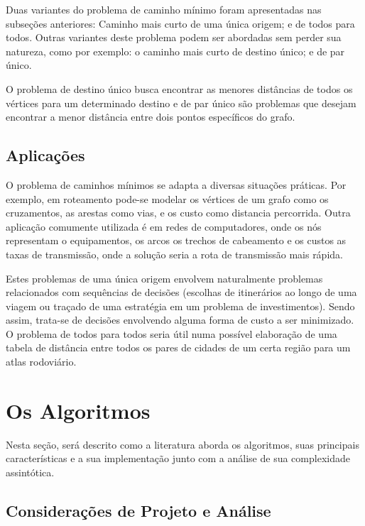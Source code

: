 \documentclass[12pt]{article}
\begin{document}
Duas variantes do problema de caminho mínimo foram apresentadas nas subseções anteriores: Caminho mais curto de uma única origem; e de todos para todos. Outras variantes deste problema podem ser abordadas sem perder sua natureza, como por exemplo: o caminho mais curto de destino único; e de par único.

	O problema de destino único busca encontrar as menores distâncias de todos os vértices para um determinado destino e de par único são problemas que desejam encontrar a menor distância entre dois pontos específicos do grafo.



\subsection{Aplicações}
	
 O problema de caminhos mínimos se adapta a diversas situações práticas. Por exemplo, em roteamento pode-se modelar os vértices de um grafo como os cruzamentos, as arestas como vias, e os custo como distancia percorrida. Outra aplicação comumente utilizada é em redes de computadores, onde os nós representam o equipamentos, os arcos os trechos de cabeamento e os custos as taxas de transmissão, onde a solução seria a rota de transmissão mais rápida.
	
	Estes problemas de uma única origem envolvem naturalmente problemas relacionados com sequências de decisões (escolhas de itinerários ao longo de uma viagem ou traçado de uma estratégia em um problema de investimentos). Sendo assim, trata-se de decisões envolvendo alguma forma de custo a ser minimizado. O problema de todos para todos seria útil numa possível elaboração de uma tabela de distância entre todos os pares de cidades de um certa região para um atlas rodoviário.



\section{Os Algoritmos}

Nesta seção, será descrito como a literatura aborda os algoritmos, suas principais características e a sua implementação junto com a análise de sua complexidade assintótica.


\subsection{Considerações de Projeto e Análise}
\end{document}
